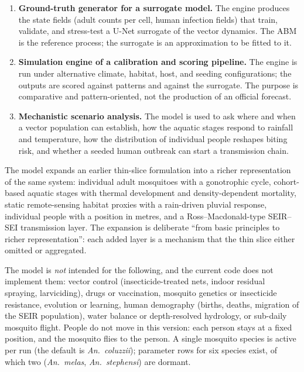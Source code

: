 \documentclass[11pt,a4paper]{article}
\begin{document}
\begin{enumerate}
\item \textbf{Ground-truth generator for a surrogate model.} The engine
  produces the state fields (adult counts per cell, human infection
  fields) that train, validate, and stress-test a U-Net surrogate of the
  vector dynamics. The ABM is the reference process; the surrogate is an
  approximation to be fitted to it.
\item \textbf{Simulation engine of a calibration and scoring pipeline.}
  The engine is run under alternative climate, habitat, host, and
  seeding configurations; the outputs are scored against patterns and
  against the surrogate. The purpose is comparative and
  pattern-oriented, not the production of an official forecast.
\item \textbf{Mechanistic scenario analysis.} The model is used to ask
  where and when a vector population can establish, how the aquatic
  stages respond to rainfall and temperature, how the distribution of individual
  people reshapes biting risk, and whether a seeded human
  outbreak can start a transmission chain.
\end{enumerate}

The model expands an earlier thin-slice formulation into a richer
representation of the same system: individual adult mosquitoes with a
gonotrophic cycle, cohort-based aquatic stages with thermal development
and density-dependent mortality, static remote-sensing habitat proxies
with a rain-driven pluvial response, individual people with a position in metres, and a Ross--Macdonald-type SEIR--SEI
transmission layer. The expansion is deliberate ``from basic principles
to richer representation'': each added layer is a mechanism that the
thin slice either omitted or aggregated.

The model is \emph{not} intended for the following, and the current code
does not implement them: vector control (insecticide-treated nets,
indoor residual spraying, larviciding), drugs or vaccination, mosquito
genetics or insecticide resistance, evolution or learning, human
demography (births, deaths, migration of the SEIR population), water
balance or depth-resolved hydrology, or sub-daily mosquito flight.
People do not move in this version: each person stays at a fixed position, and
the mosquito flies to the person.
A single mosquito species is active per run (the default is
\emph{An.\ coluzzii}); parameter rows for six species exist, of which
two (\emph{An.\ melas}, \emph{An.\ stephensi}) are dormant.
\end{document}
